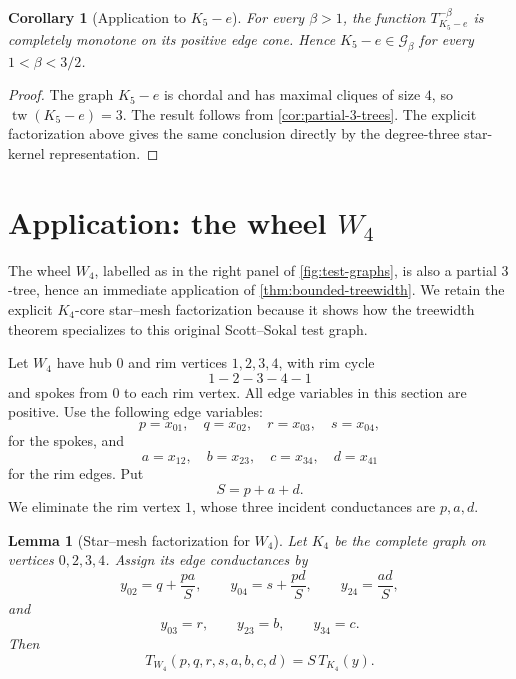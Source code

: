 \documentclass[preprint,12pt,authoryear]{elsarticle}
\numberwithin{equation}{section}
\newtheorem{lemma}[theorem]{Lemma}
\newtheorem{corollary}[theorem]{Corollary}
\theoremstyle{definition}
\theoremstyle{remark}
\newcommand{\calG}{\mathcal{G}}
\newcommand{\1}{\mathbf{1}}
\newcommand{\tw}{\operatorname{tw}}
\begin{document}
\begin{corollary}[Application to $K_5-e$]
\label{cor:k5e}
For every $\beta>1$, the function $T_{K_5-e}^{-\beta}$ is completely monotone on its positive edge cone.  Hence $K_5-e\in\calG_\beta$ for every $1<\beta<3/2$.
\end{corollary}

\begin{proof}
The graph \(K_5-e\) is chordal and has maximal cliques of size \(4\), so \(\tw(K_5-e)=3\).  The result follows from \cref{cor:partial-3-trees}.  The explicit factorization above gives the same conclusion directly by the degree-three star-kernel representation.
\end{proof}

\section{Application: the wheel \texorpdfstring{$W_4$}{W4}}
\label{sec:w4}

The wheel \(W_4\), labelled as in the right panel of \cref{fig:test-graphs}, is also a partial \(3\)-tree, hence an immediate application of \cref{thm:bounded-treewidth}.  We retain the explicit \(K_4\)-core star--mesh factorization because it shows how the treewidth theorem specializes to this original Scott--Sokal test graph.

Let $W_4$ have hub $0$ and rim vertices $1,2,3,4$, with rim cycle
\begin{equation}
        1-2-3-4-1
\end{equation}
and spokes from $0$ to each rim vertex.  All edge variables in this section are positive.  Use the following edge variables:
\begin{equation}
        p=x_{01},\quad q=x_{02},\quad r=x_{03},\quad s=x_{04},
\end{equation}
for the spokes, and
\begin{equation}
        a=x_{12},\quad b=x_{23},\quad c=x_{34},\quad d=x_{41}
\end{equation}
for the rim edges.  Put
\begin{equation}
        S=p+a+d.
\end{equation}
We eliminate the rim vertex $1$, whose three incident conductances are $p,a,d$.

\begin{lemma}[Star--mesh factorization for $W_4$]
\label{lem:w4-factor}
Let $K_4$ be the complete graph on vertices $0,2,3,4$.  Assign its edge conductances by
\begin{equation}
        y_{02}=q+\frac{pa}{S},
        \qquad
        y_{04}=s+\frac{pd}{S},
        \qquad
        y_{24}=\frac{ad}{S},
\end{equation}
and
\begin{equation}
        y_{03}=r,
        \qquad
        y_{23}=b,
        \qquad
        y_{34}=c.
\end{equation}
Then
\begin{equation}
        T_{W_4}(p,q,r,s,a,b,c,d)=S\,T_{K_4}(y).
\end{equation}
\end{lemma}
\end{document}
